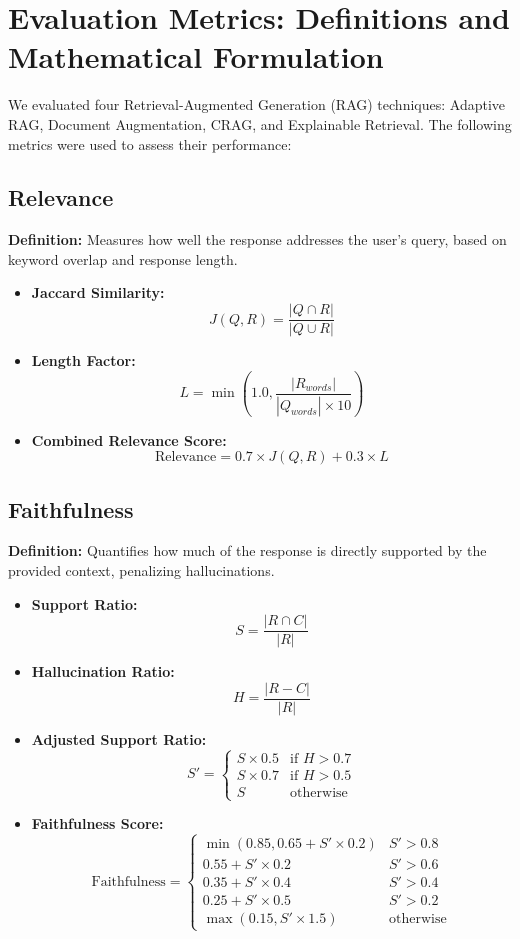 
\section{Evaluation Metrics: Definitions and Mathematical Formulation}

We evaluated four Retrieval-Augmented Generation (RAG) techniques: Adaptive RAG, Document Augmentation, CRAG, and Explainable Retrieval. The following metrics were used to assess their performance:

\subsection{Relevance}
\textbf{Definition:} Measures how well the response addresses the user's query, based on keyword overlap and response length.
\begin{itemize}
    \item \textbf{Jaccard Similarity:}
    \[
    J(Q, R) = \frac{|Q \cap R|}{|Q \cup R|}
    \]
    \item \textbf{Length Factor:}
    \[
    L = \min\left(1.0, \frac{|R_{words}|}{|Q_{words}| \times 10}\right)
    \]
    \item \textbf{Combined Relevance Score:}
    \[
    \text{Relevance} = 0.7 \times J(Q, R) + 0.3 \times L
    \]
\end{itemize}

\subsection{Faithfulness}
\textbf{Definition:} Quantifies how much of the response is directly supported by the provided context, penalizing hallucinations.
\begin{itemize}
    \item \textbf{Support Ratio:}
    \[
    S = \frac{|R \cap C|}{|R|}
    \]
    \item \textbf{Hallucination Ratio:}
    \[
    H = \frac{|R - C|}{|R|}
    \]
    \item \textbf{Adjusted Support Ratio:}
    \[
    S' = \begin{cases}
        S \times 0.5 & \text{if } H > 0.7 \\
        S \times 0.7 & \text{if } H > 0.5 \\
        S & \text{otherwise}
    \end{cases}
    \]
    \item \textbf{Faithfulness Score:}
    \[
    \text{Faithfulness} =
    \begin{cases}
        \min(0.85, 0.65 + S' \times 0.2) & S' > 0.8 \\
        0.55 + S' \times 0.2 & S' > 0.6 \\
        0.35 + S' \times 0.4 & S' > 0.4 \\
        0.25 + S' \times 0.5 & S' > 0.2 \\
        \max(0.15, S' \times 1.5) & \text{otherwise}
    \end{cases}
    \]
\end{itemize}


